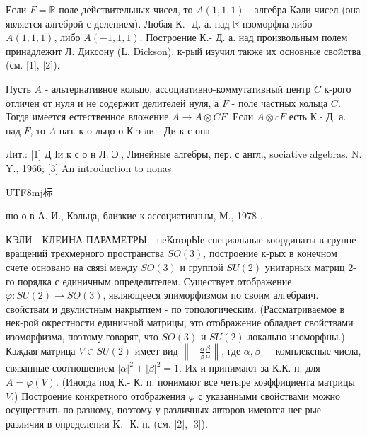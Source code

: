 \documentclass[10pt]{article}
\begin{document}
Если $F=\mathbb{R}$-поле действительных чисел, то $A(1,1,1)$ - алгебра Кәли чисел (она является алгеброй с делением). Любая К.- Д. а. над $\mathbb{R}$ пзоморфна либо $A(1,1,1)$, либо $A(-1,1,1)$. Построение К.- Д. а. над произвольным полем принадлежит Л. Диксону (L. Dickson), к-рый изучил также их основные свойства (см. [1], [2]).



Пусть $A$ - альтернативное кольцо, ассоциативно-коммутативный центр $C$ к-рого отличен от нуля и не содержит делителей нуля, а $F$ - поле частных кольца $C$. Тогда имеется естественное вложение $A \rightarrow A \otimes C F$. Если $A \otimes c F$ есть К.- Д. а. над $F$, то $A$ наз. к о льцо о К э ли - Ди к с она.



Лит.: [1] Д Іи к с о н Л. Э., Линейные алгебры, пер. с англ., sociative algebras. N. Y., 1966; [3] An introduction to nonas\begin{CJK}{UTF8}{mj}标\end{CJK} шо о в А. И., Кольца, близкие к ассоциативным, М., 1978 .



КЭЛИ - КЛЕИНА ПАРАМЕТРЫ - неКоторЫе специальные координаты в группе вращений трехмерного пространства $S O(3)$, построение к-рых в конечном счете основано на связі между $S O(3)$ и группой $S U(2)$ унитарных матриц 2-го порядка с единичным определителем. Существует отображение $\varphi: S U(2) \rightarrow S O(3)$, являющееся эпиморфизмом по своим алгебраич. свойствам и двулистным накрытием - по топологическим. (Рассматриваемое в нек-рой окрестности единичной матрицы, это отображение обладает свойствами изоморфизма, поэтому говорят, что $S O(3)$ и $S U(2)$ локально изоморфны.) Каждая матрица $V \in S U(2)$ имеет вид $\left\|-\frac{\alpha}{\beta} \frac{\beta}{\alpha}\right\|$, где $\alpha, \beta-$ комплексные числа, связанные соотношением $|\alpha|^{2}+|\beta|^{2}=1$. Их и принимают за К.К. п. для $A=\varphi(V)$. (Иногда под К.- К. п. понимают все четыре коэффициента матрицы $V$.) Построение конкретного отображения $\varphi$ с указанными свойствами можно осуществить по-разному, поэтому у различных авторов имеются нег-рые различия в определении K.- К. п. (см. [2], [3]).
\end{document}
